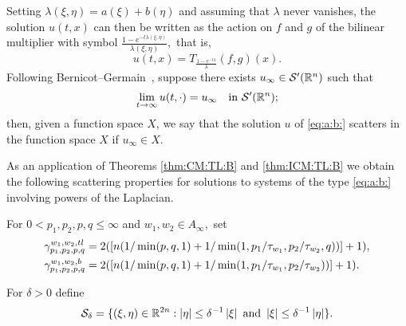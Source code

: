{Setting $\lambda(\xi,\eta)=a(\xi)+b(\eta)$ and assuming that $\lambda$ never vanishes, the solution $u(t,x)$ can then be written as the action on $f$ and $g$ of the bilinear multiplier  with symbol $\frac{1-e^{-t\lambda(\xi,\eta)}}{\lambda(\xi,\eta)},$ that is,  
\begin{equation}\label{u:T:lambda}
u(t,x) = T_{\frac{1-e^{-t\lambda}}{\lambda}}(f,g)(x).
\end{equation}
Following Bernicot--Germain~\cite[Section 9.4]{MR2680189}, suppose there exists   $u_\infty\in {\mathcal{S}'}({{\mathbb R}^n})$ such that 
\begin{equation}\label{def:u:infty}
\lim\limits_{t \to \infty} u(t, \cdot ) = u_\infty \quad \text{in } {\mathcal{S}'}({{\mathbb R}^n});
\end{equation}
then, given a function space $X$, we say that the solution $u$ of  \eqref{eq:a:b:} scatters in the function space $X$ if $u_\infty \in X.$

As an application of Theorems \ref{thm:CM:TL:B} and \ref{thm:ICM:TL:B} we obtain the following scattering properties for solutions to  systems of the type \eqref{eq:a:b:} involving powers of the Laplacian. 

  

For $0<p_1,p_2, p, q\le \infty$ and $w_1,w_2\in A_\infty,$ set
\begin{align*}
\gamma_{p_1,p_2,p,q}^{w_1,w_2, tl}&=2( [n(1/\min(p,q,1)+1/\min(1,p_1/\tau_{w_1},p_2/\tau_{w_2},q))]+1),\\
 \gamma_{p_1,p_2,p,q}^{w_1,w_2,b}&=2( [n(1/\min(p,q,1)+1/\min(1,p_1/\tau_{w_1},p_2/\tau_{w_2}))]+1).
\end{align*}


For $\delta>0$ define
$$
\mathcal{S}_{\delta}=\{(\xi,\eta)\in \mathbb{R}^{2n}: \left\vert \eta \right\vert\le \delta^{-1}\left\vert \xi \right\vert\text{ and }\left\vert \xi \right\vert\le \delta^{-1}\left\vert \eta \right\vert\}.
$$

}
